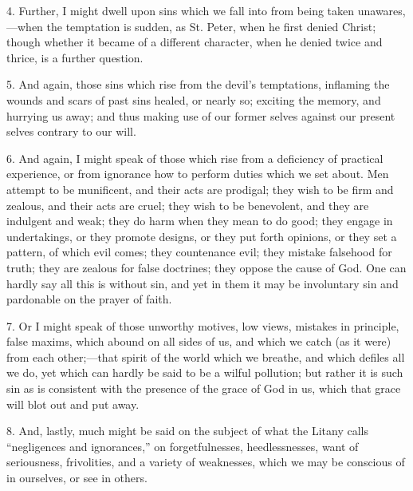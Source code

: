 4. Further, I might dwell upon sins which we fall into from being
taken unawares,—when the temptation is sudden, as St. Peter, when he
first denied Christ; though whether it became of a different
character, when he denied twice and thrice, is a further question.

5. And again, those sins which rise from the devil's temptations,
inflaming the wounds and scars of past sins healed, or nearly so;
exciting the memory, and hurrying us away; and thus making use of our
former selves against our present selves contrary to our will.

6. And again, I might speak of those which rise from a deficiency
of practical experience, or from ignorance how to perform duties which
we set about. Men attempt to be munificent, and their acts are
prodigal; they wish to be firm and zealous, and their acts are cruel;
they wish to be benevolent, and they are indulgent and weak; they do
harm when they mean to do good; they engage in undertakings, or they
promote designs, or they put forth opinions, or they set a pattern, of
which evil comes; they countenance evil; they mistake falsehood for
truth; they are zealous for false doctrines; they oppose the cause of
God. One can hardly say all this is without sin, and yet in them it
may be involuntary sin and pardonable on the prayer of faith.

7. Or I might speak of those unworthy motives, low views, mistakes
in principle, false maxims, which abound on all sides of us, and which
we catch (as it were) from each other;—that spirit of the world
which we breathe, and which defiles all we do, yet which can hardly be
said to be a wilful pollution; but rather it is such sin as is
consistent with the presence of the grace of God in us, which that
grace will blot out and put away.

8. And, lastly, much might be said on the subject of what the
Litany calls ``negligences and ignorances,'' on
forgetfulnesses, heedlessnesses, want of seriousness, frivolities, and
a variety of weaknesses, which we may be conscious of in ourselves, or
see in others.

